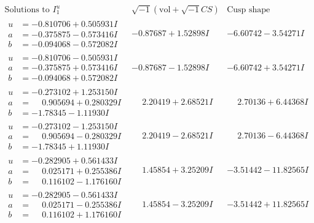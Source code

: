 \documentclass[1p]{elsarticle_modified}
\theoremstyle{definition}
\newcommand{\I}{\sqrt{-1}}
\begin{document}
$$\begin{array}{c|c|c}  
\text{Solutions to }I^u_{1}& \I (\text{vol} + \sqrt{-1}CS) & \text{Cusp shape}\\
 \hline 
\begin{aligned}
u &= -0.810706 + 0.505931 I \\
a &= -0.375875 - 0.573416 I \\
b &= -0.094068 - 0.572082 I\end{aligned}
 & -0.87687 + 1.52898 I & -6.60742 - 3.54271 I \\ \hline\begin{aligned}
u &= -0.810706 - 0.505931 I \\
a &= -0.375875 + 0.573416 I \\
b &= -0.094068 + 0.572082 I\end{aligned}
 & -0.87687 - 1.52898 I & -6.60742 + 3.54271 I \\ \hline\begin{aligned}
u &= -0.273102 + 1.253150 I \\
a &= \phantom{-}0.905694 + 0.280329 I \\
b &= -1.78345 - 1.11930 I\end{aligned}
 & \phantom{-}2.20419 + 2.68521 I & \phantom{-}2.70136 + 6.44368 I \\ \hline\begin{aligned}
u &= -0.273102 - 1.253150 I \\
a &= \phantom{-}0.905694 - 0.280329 I \\
b &= -1.78345 + 1.11930 I\end{aligned}
 & \phantom{-}2.20419 - 2.68521 I & \phantom{-}2.70136 - 6.44368 I \\ \hline\begin{aligned}
u &= -0.282905 + 0.561433 I \\
a &= \phantom{-}0.025171 + 0.255386 I \\
b &= \phantom{-}0.116102 - 1.176160 I\end{aligned}
 & \phantom{-}1.45854 + 3.25209 I & -3.51442 - 11.82565 I \\ \hline\begin{aligned}
u &= -0.282905 - 0.561433 I \\
a &= \phantom{-}0.025171 - 0.255386 I \\
b &= \phantom{-}0.116102 + 1.176160 I\end{aligned}
 & \phantom{-}1.45854 - 3.25209 I & -3.51442 + 11.82565 I \\ \hline\begin{aligned}

\end{aligned}
\end{array}$$
\end{document}
